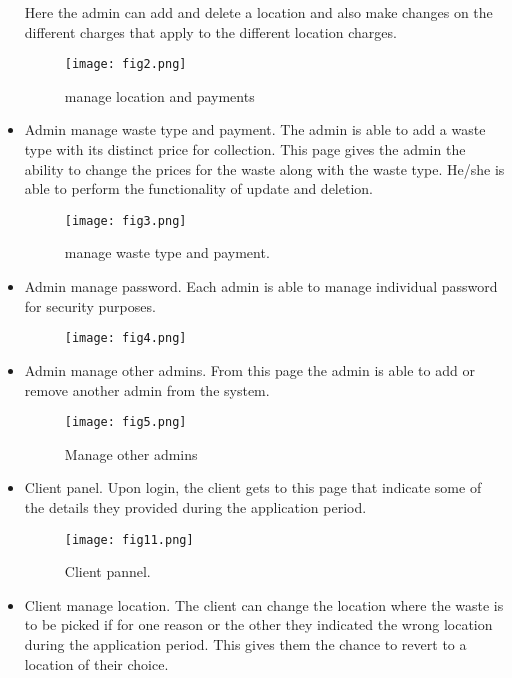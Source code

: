 \documentclass{article}
\begin{document}
\begin{itemize}
\newline
Here the admin can add and delete a location and also make changes on the different charges that apply to the different location charges.
\begin{figure}[h]
\texttt{[image: fig2.png]}
\caption{manage  location and payments}
\end{figure}
\newline
\newpage
\item Admin manage waste type and payment.
\newline
 The admin is able to add a waste type with its distinct price for collection. This page gives the admin the ability to change the prices for the waste along with the waste type. He/she is able to perform the functionality of update and deletion.
\begin{figure}[h]
\texttt{[image: fig3.png]}
\caption{manage waste type and payment.}
\end{figure}
\newline
\item Admin manage password.
\newline Each admin is able to manage individual password for security purposes.
\begin{figure}[h]
\texttt{[image: fig4.png]}
\end{figure}
\newline
\newpage
\item Admin manage other admins.
\newline From this page the admin is able to add or remove another admin from the system.
\begin{figure}[h]
\texttt{[image: fig5.png]}
\caption{Manage other admins}
\end{figure}
\newline
\item Client panel.
\newline Upon login, the client gets to this page that indicate some of the details they provided during the application period.
\begin{figure}[h]
\texttt{[image: fig11.png]}
\caption{Client pannel.}
\end{figure}
\newline
\newpage
\item Client manage location.
\newline The client can change the location where the waste is to be picked if for one reason or the other they indicated the wrong location during the application period. This gives them the chance to revert to a location of their choice.

\end{itemize}
\end{document}
